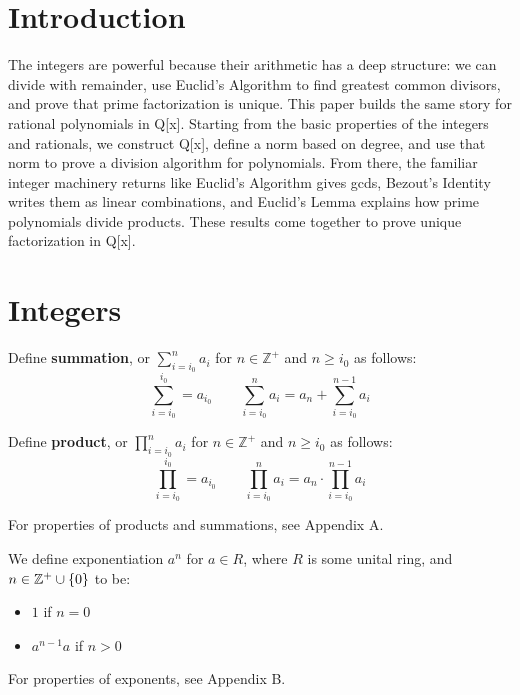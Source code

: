 \section{Introduction}
The integers are powerful because their arithmetic has a deep structure:  we can divide with remainder, use Euclid’s Algorithm to find greatest common divisors, and prove that prime factorization is unique. This paper builds the same story for rational polynomials in Q[x]. Starting from the basic properties of the integers and rationals, we construct Q[x], define a norm based on degree, and use that norm to prove a division algorithm for polynomials. From there, the familiar integer machinery returns like Euclid’s Algorithm gives gcds, Bezout’s Identity writes them as linear combinations, and Euclid’s Lemma explains how prime polynomials divide products. These results come together to prove unique factorization in Q[x].



\section{Integers}



\begin{definition}
     Define \textbf{summation}, or $\sum_{i=i_0}^n a_i$ for $n \in \mathbb{Z}^+$ and $n \geq i_0$ as follows: \[
        \sum_{i=i_0}^{i_0} = a_{i_0} \qquad \sum_{i=i_0}^{n}a_i=a_n+\sum_{i=i_0}^{n-1}  a_i
     \]
\end{definition}
\begin{definition}
     Define \textbf{product}, or $\prod_{i=i_0}^n a_i$ for $n \in \mathbb{Z}^+$ and $n \geq i_0$ as follows: \[
        \prod_{i=i_0}^{i_0} = a_{i_0} \qquad \prod_{i=i_0}^{n}a_i=a_n \cdot \prod_{i=i_0}^{n-1}  a_i
     \]
\end{definition}
For properties of products and summations, see Appendix A.


\begin{definition}
We define exponentiation $a^n$ for $a\in R$, where $R$ is some unital ring, and $n\in\mathbb{Z}^+\cup\{0\}$ to be:
\begin{itemize}
    \item $1$ if $n=0$
    \item $a^{n-1}a$ if $n>0$
\end{itemize}
\end{definition}
For properties of exponents, see Appendix B.

